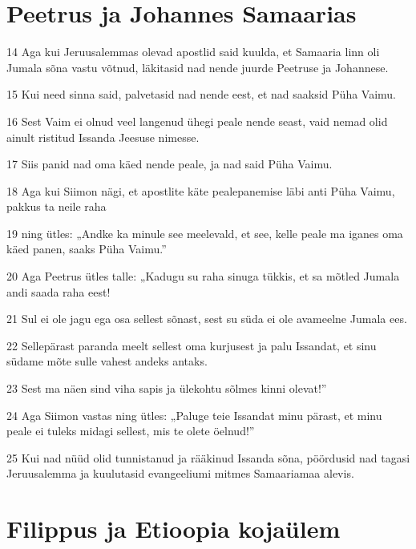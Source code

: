 \section*{Peetrus ja Johannes Samaarias}

\par 14 Aga kui Jeruusalemmas olevad apostlid said kuulda, et Samaaria linn oli Jumala sõna vastu võtnud, läkitasid nad nende juurde Peetruse ja Johannese.
\par 15 Kui need sinna said, palvetasid nad nende eest, et nad saaksid Püha Vaimu.
\par 16 Sest Vaim ei olnud veel langenud ühegi peale nende seast, vaid nemad olid ainult ristitud Issanda Jeesuse nimesse.
\par 17 Siis panid nad oma käed nende peale, ja nad said Püha Vaimu.
\par 18 Aga kui Siimon nägi, et apostlite käte pealepanemise läbi anti Püha Vaimu, pakkus ta neile raha
\par 19 ning ütles: „Andke ka minule see meelevald, et see, kelle peale ma iganes oma käed panen, saaks Püha Vaimu.”
\par 20 Aga Peetrus ütles talle: „Kadugu su raha sinuga tükkis, et sa mõtled Jumala andi saada raha eest!
\par 21 Sul ei ole jagu ega osa sellest sõnast, sest su süda ei ole avameelne Jumala ees.
\par 22 Sellepärast paranda meelt sellest oma kurjusest ja palu Issandat, et sinu südame mõte sulle vahest andeks antaks.
\par 23 Sest ma näen sind viha sapis ja ülekohtu sõlmes kinni olevat!”
\par 24 Aga Siimon vastas ning ütles: „Paluge teie Issandat minu pärast, et minu peale ei tuleks midagi sellest, mis te olete öelnud!”
\par 25 Kui nad nüüd olid tunnistanud ja rääkinud Issanda sõna, pöördusid nad tagasi Jeruusalemma ja kuulutasid evangeeliumi mitmes Samaariamaa alevis.

\section*{Filippus ja Etioopia kojaülem}

